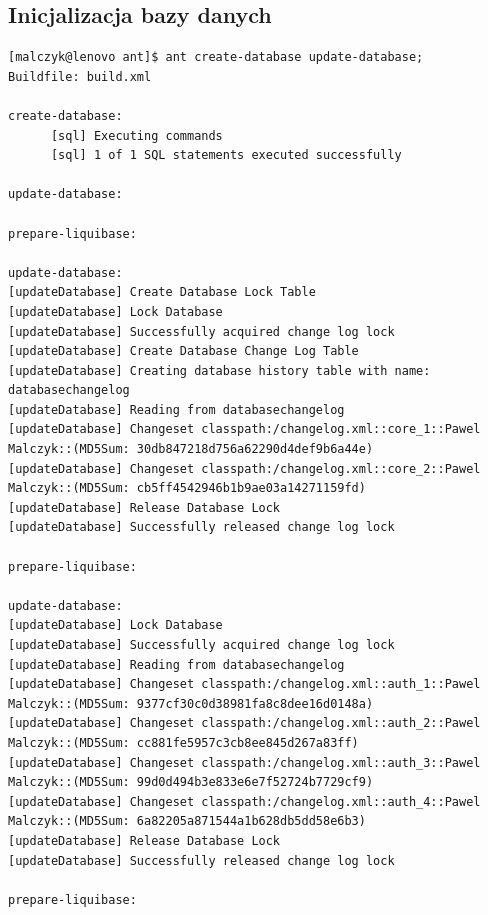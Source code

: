 \documentclass{article}
\begin{document}
\subsection{Inicjalizacja bazy danych}
{\tiny
\begin{verbatim}
[malczyk@lenovo ant]$ ant create-database update-database;
Buildfile: build.xml

create-database:
      [sql] Executing commands
      [sql] 1 of 1 SQL statements executed successfully

update-database:

prepare-liquibase:

update-database:
[updateDatabase] Create Database Lock Table
[updateDatabase] Lock Database
[updateDatabase] Successfully acquired change log lock
[updateDatabase] Create Database Change Log Table
[updateDatabase] Creating database history table with name: databasechangelog
[updateDatabase] Reading from databasechangelog
[updateDatabase] Changeset classpath:/changelog.xml::core_1::Pawel Malczyk::(MD5Sum: 30db847218d756a62290d4def9b6a44e)
[updateDatabase] Changeset classpath:/changelog.xml::core_2::Pawel Malczyk::(MD5Sum: cb5ff4542946b1b9ae03a14271159fd)
[updateDatabase] Release Database Lock
[updateDatabase] Successfully released change log lock

prepare-liquibase:

update-database:
[updateDatabase] Lock Database
[updateDatabase] Successfully acquired change log lock
[updateDatabase] Reading from databasechangelog
[updateDatabase] Changeset classpath:/changelog.xml::auth_1::Pawel Malczyk::(MD5Sum: 9377cf30c0d38981fa8c8dee16d0148a)
[updateDatabase] Changeset classpath:/changelog.xml::auth_2::Pawel Malczyk::(MD5Sum: cc881fe5957c3cb8ee845d267a83ff)
[updateDatabase] Changeset classpath:/changelog.xml::auth_3::Pawel Malczyk::(MD5Sum: 99d0d494b3e833e6e7f52724b7729cf9)
[updateDatabase] Changeset classpath:/changelog.xml::auth_4::Pawel Malczyk::(MD5Sum: 6a82205a871544a1b628db5dd58e6b3)
[updateDatabase] Release Database Lock
[updateDatabase] Successfully released change log lock

prepare-liquibase:


\end{verbatim}}
\end{document}
